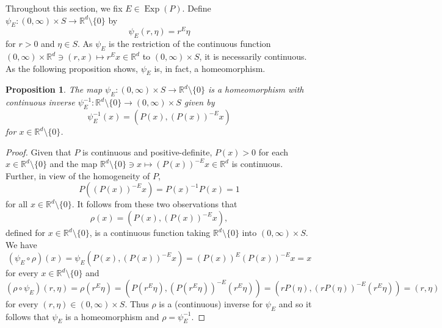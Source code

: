 \documentclass[11pt]{article}
\newtheorem{proposition}[theorem]{Proposition}
\theoremstyle{remark}
\newcommand\Exp{\operatorname{Exp}}
\begin{document}
Throughout this section, we fix $E\in\Exp(P)$. Define $\psi_E:(0,\infty)\times S\to\mathbb{R}^d\setminus\{0\}$ by
\begin{equation}\label{eq:Homeomorphism}
\psi_E(r,\eta)=r^E\eta
\end{equation}
for $r>0$ and $\eta\in S$. As $\psi_E$ is the restriction of the continuous function $(0,\infty)\times \mathbb{R}^d\ni (r,x)\mapsto r^E x\in\mathbb{R}^d$ to $(0,\infty)\times S$, it is necessarily continuous. As the following proposition shows, $\psi_E$ is, in fact, a homeomorphism.

\begin{proposition}\label{prop:PsiHomeomorphism}
The map $\psi_E:(0,\infty)\times S\to\mathbb{R}^d\setminus\{0\}$ is a homeomorphism with continuous inverse $\psi_E^{-1}:\mathbb{R}^d\setminus\{0\}\to (0,\infty)\times S$ given by
\begin{equation*}
\psi_E^{-1}(x)=(P(x),(P(x))^{-E}x)
\end{equation*}
for $x\in\mathbb{R}^d\setminus\{0\}$.
\end{proposition}

\begin{proof}
Given that $P$ is continuous and positive-definite, $P(x)>0$ for each $x\in \mathbb{R}^d\setminus\{0\}$ and the map $\mathbb{R}^d\setminus\{0\}\ni x \mapsto (P(x))^{-E}x\in \mathbb{R}^d$ is continuous. Further, in view of the homogeneity of $P$,
\begin{equation*}
P\left((P(x))^{-E} x \right)=P(x)^{-1}P(x)=1
\end{equation*}
for all $x\in\mathbb{R}^d\setminus\{0\}$. It follows from these two observations that
\begin{equation*}
\rho(x)=(P(x),(P(x))^{-E}x),
\end{equation*}
defined for $x\in\mathbb{R}^d\setminus\{0\}$, is a continuous function taking $\mathbb{R}^d\setminus\{0\}$ into $(0,\infty)\times S$. We have
\begin{equation*}
(\psi_E\circ \rho)(x)=\psi_E(P(x),(P(x))^{-E}x)=(P(x))^{E}(P(x))^{-E}x=x
\end{equation*}
for every $x\in \mathbb{R}^d\setminus \{0\}$ and
\begin{equation*}
(\rho\circ\psi_E)(r,\eta)=\rho(r^E\eta)=(P(r^{E}\eta),(P(r^{E}\eta))^{-E}(r^E\eta))=(rP(\eta),(rP(\eta))^{-E}(r^{E}\eta))=(r,\eta)
\end{equation*}
for every $(r,\eta)\in (0,\infty)\times S$. Thus $\rho$ is a (continuous) inverse for $\psi_E$ and so it follows that $\psi_E$ is a homeomorphism and $\rho=\psi_E^{-1}$.
\end{proof}
\end{document}
